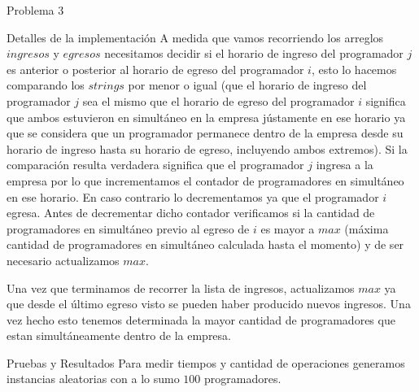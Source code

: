 \begin{section}{Problema 3}
\begin{subsection}{Detalles de la implementación}
	A medida que vamos recorriendo los arreglos $ingresos$ y $egresos$ necesitamos decidir si el horario de ingreso del programador $j$ es anterior o posterior al horario de egreso del programador $i$, esto lo hacemos comparando los $strings$ por menor o igual (que el horario de ingreso del programador $j$ sea el mismo que el horario de egreso del programador $i$ significa que ambos estuvieron en simultáneo en la empresa jústamente en ese horario ya que se considera que un programador permanece dentro de la empresa desde su horario de ingreso hasta su horario de egreso, incluyendo ambos extremos). Si la comparación resulta verdadera significa que el programador $j$ ingresa a la empresa por lo que incrementamos el contador de programadores en simultáneo en ese horario. En caso contrario lo decrementamos ya que el programador $i$ egresa. Antes de decrementar dicho contador verificamos si la cantidad de programadores en simultáneo previo al egreso de $i$ es mayor a $max$ (máxima cantidad de programadores en simultáneo calculada hasta el momento) y de ser necesario actualizamos $max$.

	Una vez que terminamos de recorrer la lista de ingresos, actualizamos $max$ ya que desde el último egreso visto se pueden haber producido nuevos ingresos. Una vez hecho esto tenemos determinada la mayor cantidad de programadores que estan simultáneamente dentro de la empresa.
	\end{subsection}

	\begin{subsection}{Pruebas y Resultados}
	Para medir tiempos y cantidad de operaciones generamos instancias aleatorias con a lo sumo $100$ programadores.
		

	\newpage

	\end{subsection}

\end{section}







